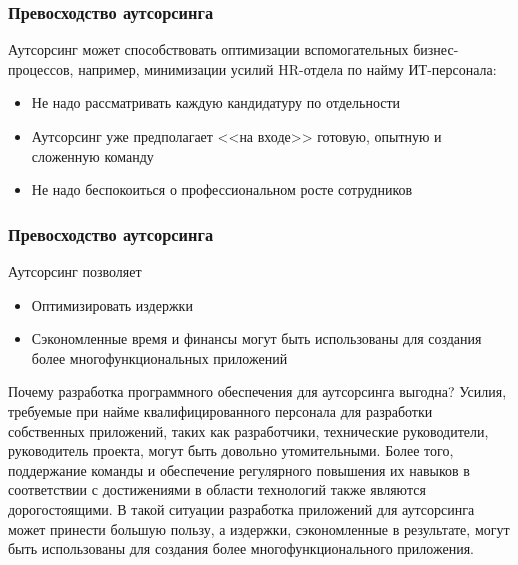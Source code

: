 \documentclass{../industrial-development}
\begin{document}
\begin{frame} \frametitle{Превосходство аутсорсинга}
Аутсорсинг может способствовать оптимизации \alert{вспомогательных} бизнес-процессов, например, минимизации усилий HR-отдела по найму ИТ-персонала:
\begin{itemize}
		\item Не надо рассматривать каждую кандидатуру по отдельности
		\item Аутсорсинг уже предполагает <<на входе>> готовую, опытную и сложенную команду
		\item Не надо беспокоиться о профессиональном росте сотрудников
\end{itemize}
\end{frame}
\begin{frame} \frametitle{Превосходство аутсорсинга}
Аутсорсинг позволяет
\begin{itemize}
		\item Оптимизировать издержки
		\item Сэкономленные время и финансы могут быть использованы для создания более многофункциональных приложений
\end{itemize}
\end{frame}
\lecturenotes
Почему разработка программного обеспечения для аутсорсинга выгодна?
Усилия, требуемые при найме квалифицированного персонала для разработки собственных приложений, таких как разработчики, технические руководители, руководитель проекта, могут быть довольно утомительными. Более того, поддержание команды и обеспечение регулярного повышения их навыков в соответствии с достижениями в области технологий также являются дорогостоящими. В такой ситуации разработка приложений для аутсорсинга может принести большую пользу, а издержки, сэкономленные в результате, могут быть использованы для создания более многофункционального приложения. ~\cite[с.~31--38]{Аникин}
\end{document}
